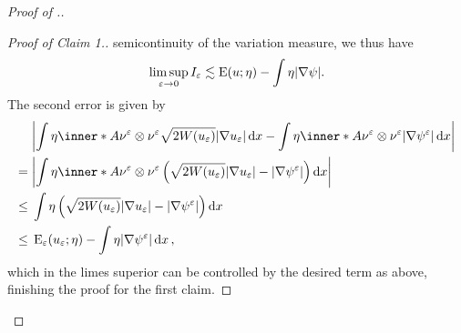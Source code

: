 \begin{proof}[Proof of .]
\begin{proof}[Proof of Claim 1.]
		semicontinuity of the variation measure, we thus have
		\begin{equation*}
			\limsup_{ \varepsilon \to 0 }
				I_{ \varepsilon }
			\lesssim
			\operatorname{E} ( u ; \eta )
			-
			\int
				\eta
			\abs{ \nabla \psi }.
		\end{equation*}
		The second error is given by
		\begin{align*}
			& \abs{
				\int
					\eta
					\inner*{ A }{ \nu^{ \varepsilon } \otimes \nu^{ \varepsilon 
					} }
					\sqrt{ 2 W ( u_{ \varepsilon } ) }
					\abs{ \nabla u_{ \varepsilon } }
				\dd{ x }
				-
				\int
					\eta
					\inner*{ A }{ \nu^{ \varepsilon } \otimes \nu^{ \varepsilon 
					} }
					\abs{ \nabla \psi^{ \varepsilon } }
				\dd{ x }
			}
			\\
			={} &
			\abs{
				\int
					\eta
					\inner*{ A }{ \nu^{ \varepsilon } \otimes \nu^{ \varepsilon 
					} }
					\left(
						\sqrt{ 2 W ( u_{ \varepsilon } ) } \abs{ \nabla u_{ 
						\varepsilon } } 
						-
						\abs{ \nabla \psi^{ \varepsilon } }
					\right)
				\dd{ x }
			}
			\\
			\leq {} &
			\int
				\eta
				\left(
					\sqrt{ 2 W ( u_{ \varepsilon } ) }
					\abs{ \nabla u_{ \varepsilon } }
					-
					\abs{ \nabla \psi^{ \varepsilon } }
				\right)
			\dd{ x }
			\\
			\leq{} &
			\energy_{ \varepsilon } ( u_{ \varepsilon } ; \eta )
			-
			\int
				\eta 
				\abs{ \nabla \psi^{ \varepsilon } }
			\dd{ x },
		\end{align*}
		which in the limes superior can be controlled by the desired term as 
		above, finishing the proof for the first claim.
	\end{proof}
	

\end{proof}
